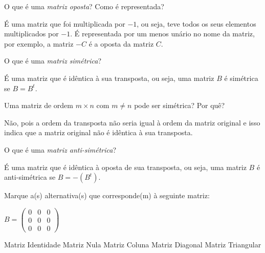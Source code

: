 \documentclass[pdftex, brazil, 12pt, oneside, addpoints, answers]{exam}
\newcommand{\vf}[1][{}]{%
  \fillin[#1][0.25in]%
}
\begin{document}
\begin{questions}

\question
O que é uma \emph{matriz oposta}? Como é representada?
\begin{solutionorlines}[0.50in]
  É uma matriz que foi multiplicada por $-1$, ou seja, teve todos os seus
  elementos multiplicados por $-1$. É representada por um menos unário no
  nome da matriz, por exemplo, a matriz $-C$ é a oposta da matriz $C$.
\end{solutionorlines}

\question
O que é uma \emph{matriz simétrica}?
\begin{solutionorlines}[0.50in]
  É uma matriz que é idêntica à sua transposta, ou seja, uma matriz $B$
  é simétrica se $B = B^t$.
\end{solutionorlines}

\question
Uma matriz de ordem $m \times n$ com $m \ne n$ pode ser simétrica? Por quê?
\begin{solutionorlines}[0.50in]
  Não, pois a ordem da transposta não seria igual à ordem da matriz original e
  isso indica que a matriz original não é idêntica à sua transposta.
\end{solutionorlines}

\question
O que é uma \emph{matriz anti-simétrica}?
\begin{solutionorlines}[0.50in]
  É uma matriz que é idêntica à oposta de sua transposta, ou seja, uma matriz $B$
  é anti-simétrica se $B = -(B^t)$.
\end{solutionorlines}

\question
Marque a(s) alternativa(s) que corresponde(m) à seguinte matriz:

\hspace{5cm}$B = \begin{pmatrix}
  0 & 0 & 0\\
  0 & 0 & 0\\
  0 & 0 & 0
\end{pmatrix}$
\begin{checkboxes}
  \choice Matriz Identidade
  \CorrectChoice Matriz Nula
  \choice Matriz Coluna
  \CorrectChoice Matriz Diagonal
  \choice Matriz Triangular
\end{checkboxes}


\end{questions}
\end{document}
